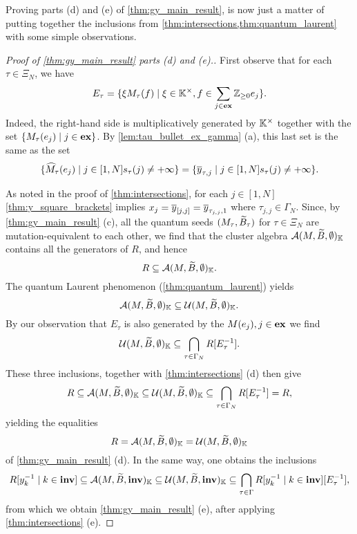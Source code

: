 Proving parts (d) and (e) of \cref{thm:gy_main_result}, is now just a matter of putting
together the inclusions from \cref{thm:intersections,thm:quantum_laurent} with some
simple observations.
\begin{proof}[Proof of \cref{thm:gy_main_result} parts (d) and (e).]
	First observe that for each $\tau\in \Xi_N$, we have
	\begin{equation*}
		E_\tau = \{\xi M_\tau(f) \mid \xi \in \mathbb{K}^\times, f \in \sum_{j \in \mathbf{ex}} \mathbb{Z}_{\geq 0} e_j\}.
	\end{equation*}
	Indeed, the right-hand side is multiplicatively generated by $\mathbb{K}^\times$ together
	with the set $\{ M_\tau(e_j) \mid j \in \mathbf{ex}\}$. By \cref{lem:tau_bullet_ex_gamma} (a),
	this last set is the same as the set
	\begin{equation*}
		\{ \widehat{M}_\tau(e_j) \mid j \in [1, N] s_\tau(j) \neq + \infty\} = \{ \overline{y}_{\tau, j} \mid j \in [1, N] s_\tau(j) \neq + \infty\}.
	\end{equation*}

	As noted in the proof of \cref{thm:intersections}, for each $j \in [1, N]$
	\cref{thm:y_square_brackets} implies $x_j = \overline{y}_{[j, j]} = \overline{y}_{\tau_{j,j}, 1}$ where
	$\tau_{j,j} \in \Gamma_N$. Since, by \cref{thm:gy_main_result} (c), all the quantum
	seeds $(M_\tau, \widetilde{B}_\tau)$ for $\tau \in \Xi_N$ are mutation-equivalent to each other,
	we find that the cluster algebra $\mathcal{A}(M, \widetilde{B}, \emptyset)_{\mathbb{K}}$ contains all the
	generators of $R$, and hence
	\begin{equation*}
		R \subseteq \mathcal{A}(M, \widetilde{B}, \emptyset)_{\mathbb{K}}.
	\end{equation*}
	The quantum Laurent phenomenon (\cref{thm:quantum_laurent}) yields
	\begin{equation*}
		\mathcal{A}(M, \widetilde{B}, \emptyset)_{\mathbb{K}} \subseteq \mathcal{U} (M, \widetilde{B}, \emptyset)_{\mathbb{K}}.
	\end{equation*}
	By our observation that $E_\tau$ is also generated by the $M(e_j), j\in \mathbf{ex}$ we find
	\begin{equation*}
		\mathcal{U}(M, \widetilde{B}, \emptyset)_{\mathbb{K}} \subseteq \bigcap_{\tau \in \Gamma_N} R[E^{-1}_\tau].
	\end{equation*}
	These three inclusions, together with \cref{thm:intersections} (d) then give
	\begin{equation*}
		R \subseteq \mathcal{A}(M, \widetilde{B}, \emptyset)_{\mathbb{K}} \subseteq \mathcal{U} (M, \widetilde{B}, \emptyset)_{\mathbb{K}}\subseteq \bigcap_{\tau \in \Gamma_N} R[E^{-1}_\tau] = R,
	\end{equation*}
	yielding the equalities
	\begin{equation*}
		R = \mathcal{A}(M, \widetilde{B}, \emptyset)_{\mathbb{K}} = \mathcal{U} (M, \widetilde{B}, \emptyset)_{\mathbb{K}}
	\end{equation*}
	of \cref{thm:gy_main_result} (d). In the same way, one obtains the inclusions
	\begin{equation*}
		R[y_k^{-1} \mid k \in \mathbf{inv}] \subseteq \mathcal{A}(M, \widetilde{B}, \mathbf{inv})_{\mathbb{K}} \subseteq \mathcal{U}(M, \widetilde{B}, \mathbf{inv})_{\mathbb{K}} \subseteq \bigcap_{\tau \in \Gamma} R[y_k^{-1} \mid k \in \mathbf{inv}][E^{-1}_\tau] ,
	\end{equation*}
	from which we obtain \cref{thm:gy_main_result} (e), after applying
	\cref{thm:intersections} (e).
\end{proof}
